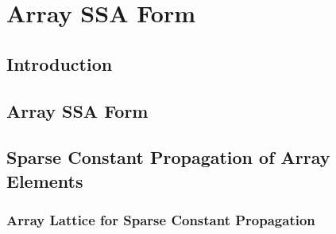 \chapter{Array SSA Form }
\graphicspath{{part2/array_ssa/Figs/}{array_ssa/Figs/}{Figs/}}

\section{Introduction}
\label{sec:intro}

\section{Array SSA Form}
\label{sec:arrayssa}

\section{Sparse Constant Propagation of Array Elements}\label{sec:cp}
\subsection{Array Lattice for Sparse Constant Propagation }
\label{sec:arraylattice}

